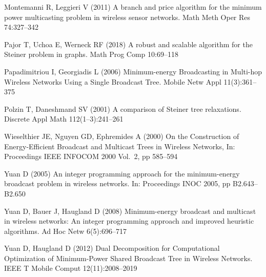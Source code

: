 \documentclass[natbib,smallextended]{svjour3}       %
\begin{document}
\begin{thebibliography}{}
Montemanni R, Leggieri V (2011)
A branch and price algorithm for the minimum power multicasting problem in wireless sensor networks.
Math Meth Oper Res
74:327--342

Pajor T, Uchoa E, Werneck RF (2018)
A robust and scalable algorithm for the Steiner problem in graphs.
Math Prog Comp 10:69--118

Papadimitriou I, Georgiadis L (2006)
Minimum-energy Broadcasting in Multi-hop Wireless Networks Using a Single Broadcast Tree.
Mobile Netw Appl
11(3):361--375

Polzin T, Daneshmand SV (2001)
A comparison of Steiner tree relaxations.
Discrete Appl Math
112(1--3):241--261

Wieselthier JE, Nguyen GD, Ephremides A (2000)
On the Construction of Energy-Efficient Broadcast and Multicast Trees in Wireless Networks,
In: Proceedings IEEE INFOCOM 2000 Vol.\ 2, pp 585--594

Yuan D (2005)
An integer programming approach for the minimum-energy broadcast problem in wireless networks.
In: Proceedings INOC 2005, pp B2.643--B2.650

Yuan D, Bauer J, Haugland D (2008)
Minimum-energy broadcast and multicast in wireless networks: An
integer programming approach and improved heuristic algorithms.
Ad Hoc Netw
6(5):696--717

Yuan D, Haugland D (2012)
Dual Decomposition for Computational Optimization of Minimum-Power Shared Broadcast Tree in Wireless Networks.
IEEE T Mobile Comput
12(11):2008--2019

\end{thebibliography}
\end{document}
